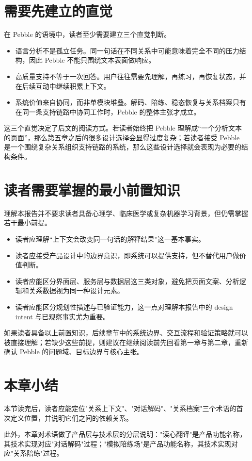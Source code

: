 \section{需要先建立的直觉}

在 Pebble 的语境中，读者至少需要建立三个直觉判断。

\begin{itemize}
  \item 语言分析不是孤立任务。同一句话在不同关系中可能意味着完全不同的压力结构，因此 Pebble 不能只围绕文本表面做响应。
  \item 高质量支持不等于一次回答。用户往往需要先理解，再练习，再恢复状态，并在后续互动中继续积累上下文。
  \item 系统价值来自协同，而非单模块堆叠。解码、陪练、稳态恢复与关系档案只有在同一条支持链路中协同工作时，Pebble 的整体主张才成立。
\end{itemize}

这三个直觉决定了后文的阅读方式。若读者始终把 Pebble 理解成“一个分析文本的页面”，那么第五章之后的很多设计选择会显得过度复杂；若读者接受 Pebble 是一个围绕复杂关系组织支持链路的系统，那么这些设计选择就会表现为必要的结构条件。

\section{读者需要掌握的最小前置知识}

理解本报告并不要求读者具备心理学、临床医学或复杂机器学习背景，但仍需掌握若干最小前提。

\begin{itemize}
  \item 读者应理解“上下文会改变同一句话的解释结果”这一基本事实。
  \item 读者应接受产品设计中的边界意识，即系统可以提供支持，但不替代用户做价值判断。
  \item 读者应能区分界面层、服务层与数据层这三类对象，避免把页面文案、分析逻辑和关系数据视为同一种设计元素。
  \item 读者应能区分规划性描述与已验证能力，这一点对理解本报告中的 design intent 与已观察事实尤为重要。
\end{itemize}

如果读者具备以上前置知识，后续章节中的系统边界、交互流程和验证策略就可以被直接理解；若缺少这些前提，则建议在继续阅读前先回看第一章与第二章，重新确认 Pebble 的问题域、目标边界与核心主张。

\section{本章小结}

本节读完后，读者应能定位"关系上下文"、"对话解码"、"关系档案"三个术语的首次定义位置，并说明它们之间的依赖关系。

此外，本章对术语做了产品层与技术层的分层说明："读心翻译"是产品功能名称，其技术实现对应"对话解码"过程；"模拟陪练场"是产品功能名称，其技术实现对应"关系陪练"过程。
